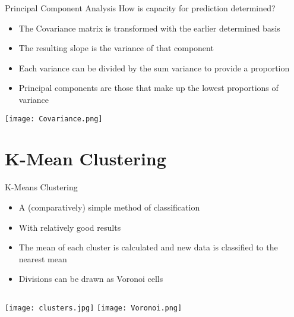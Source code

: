 \documentclass{beamer}
\begin{document}
\begin{frame}{Principal Component Analysis}
	How is capacity for prediction determined?
	\begin{itemize}
		\item The Covariance matrix is transformed with the earlier determined basis
		\item The resulting slope is the variance of that component
		\item Each variance can be divided by the sum variance to provide a proportion
		\item Principal components are those that make up the lowest proportions of variance
	\end{itemize}
	\centering
	\texttt{[image: Covariance.png]}
\end{frame}

\section[K-Means]{K-Mean Clustering}

\begin{frame}{K-Means Clustering}
	\begin{itemize}
		\item A (comparatively) simple method of classification
		\item[] With relatively good results
		\item The mean of each cluster is calculated and new data is classified to the nearest mean
		\item Divisions can be drawn as Voronoi cells
	\end{itemize}
	\vspace{0.25em}
	\begin{columns}
		\centering
		\texttt{[image: clusters.jpg]}
		\centering
		\texttt{[image: Voronoi.png]}
	\end{columns}	
\end{frame}
\end{document}

